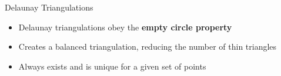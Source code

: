 \begin{frame}{Delaunay Triangulations}
	\begin{itemize}
		\item Delaunay triangulations obey the \textbf{empty circle property}
		\item Creates a balanced triangulation, reducing the number of thin triangles
		\item Always exists and is unique for a given set of points
	\end{itemize}
	
\end{frame}
